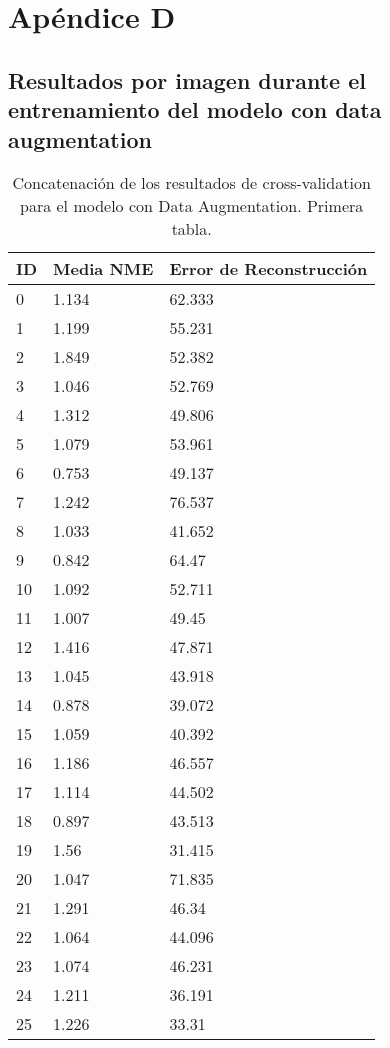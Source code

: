 
\chapter{Apéndice D}\label{ap:apendiceD}

\section{Resultados por imagen durante el entrenamiento del modelo con data augmentation}

\begin{table}[!ht]
    \centering
    \caption{Concatenación de los resultados de cross-validation para el modelo con Data Augmentation. Primera tabla.}
    \begin{tabular}{|l|l|l|}
    \hline
    \cellcolor{gray!25}\textbf{ID} & \cellcolor{gray!25}\textbf{Media NME} & \cellcolor{gray!25}\textbf{Error de Reconstrucción} \\ \hline
        0 & 1.134 & 62.333 \\ \hline
        1 & 1.199 & 55.231 \\ \hline
        2 & 1.849 & 52.382 \\ \hline
        3 & 1.046 & 52.769 \\ \hline
        4 & 1.312 & 49.806 \\ \hline
        5 & 1.079 & 53.961 \\ \hline
        6 & 0.753 & 49.137 \\ \hline
        7 & 1.242 & 76.537 \\ \hline
        8 & 1.033 & 41.652 \\ \hline
        9 & 0.842 & 64.47 \\ \hline
        10 & 1.092 & 52.711 \\ \hline
        11 & 1.007 & 49.45 \\ \hline
        12 & 1.416 & 47.871 \\ \hline
        13 & 1.045 & 43.918 \\ \hline
        14 & 0.878 & 39.072 \\ \hline
        15 & 1.059 & 40.392 \\ \hline
        16 & 1.186 & 46.557 \\ \hline
        17 & 1.114 & 44.502 \\ \hline
        18 & 0.897 & 43.513 \\ \hline
        19 & 1.56 & 31.415 \\ \hline
        20 & 1.047 & 71.835 \\ \hline
        21 & 1.291 & 46.34 \\ \hline
        22 & 1.064 & 44.096 \\ \hline
        23 & 1.074 & 46.231 \\ \hline
        24 & 1.211 & 36.191 \\ \hline
        25 & 1.226 & 33.31 \\ \hline
    \end{tabular}
\end{table}

